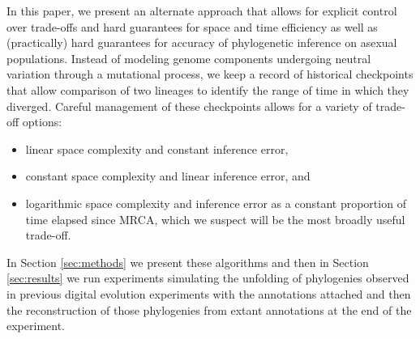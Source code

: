 In this paper, we present an alternate approach that allows for explicit control over trade-offs and hard guarantees for space and time efficiency as well as (practically) hard guarantees for accuracy of phylogenetic inference on asexual populations.
Instead of modeling genome components undergoing neutral variation through a mutational process, we keep a record of historical checkpoints that allow comparison of two lineages to identify the range of time in which they diverged.
Careful management of these checkpoints allows for a variety of trade-off options:
\begin{itemize}
  \item linear space complexity and constant inference error,
  \item constant space complexity and linear inference error, and
  \item logarithmic space complexity and inference error as a constant proportion of time elapsed since MRCA, which we suspect will be the most broadly useful trade-off.
\end{itemize}

In Section \ref{sec:methods} we present these algorithms and then in Section \ref{sec:results} we run experiments simulating the unfolding of phylogenies observed in previous digital evolution experiments with the annotations attached and then the reconstruction of those phylogenies from extant annotations at the end of the experiment.
